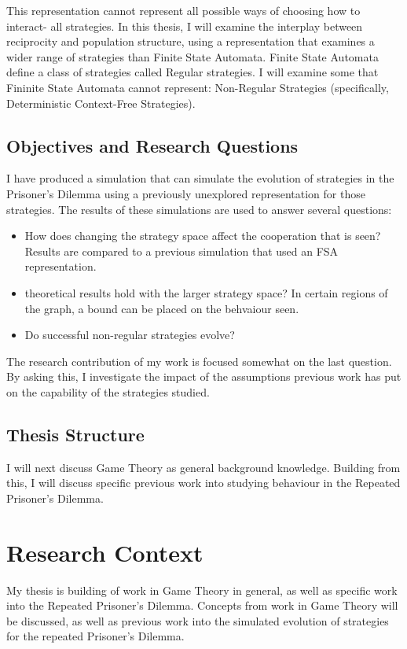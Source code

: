 \documentclass[a4paper,11pt,bcshonoursthesis,singlespace,twoside,thesisdraft,pdflatex]{cssethesis}
\begin{document}
This representation cannot represent all possible ways of choosing how to interact- all strategies. In this thesis, I will examine the interplay between reciprocity and population structure, using a representation that examines a wider range of strategies than Finite State Automata. Finite State Automata define a class of strategies called Regular strategies. I will examine some that Fininite State Automata cannot represent: Non-Regular Strategies (specifically, Deterministic Context-Free Strategies).
\section{Objectives and Research Questions}
I have produced a simulation that can simulate the evolution of strategies in the Prisoner's Dilemma using a previously unexplored representation for those strategies. 
The results of these simulations are used to answer several questions:
\begin{itemize}
\item How does changing the strategy space affect the cooperation that is seen? 
Results are compared to a previous simulation that used an FSA representation. 
\item theoretical results hold with the larger strategy space? In certain regions of the graph, a bound can be placed on the behvaiour seen. 
\item Do successful non-regular strategies evolve?
\end{itemize}
The research contribution of my work is focused somewhat on the last question. 
By asking this, I investigate the impact of the assumptions previous work has put on the capability of the strategies studied. 

\section{Thesis Structure}
I will next discuss Game Theory as general background knowledge. 
Building from this, I will discuss specific previous work into studying behaviour in the Repeated Prisoner's Dilemma. 

\chapter{Research Context}
My thesis is building of work in Game Theory in general, as well as specific work into the Repeated Prisoner's Dilemma. 
Concepts from work in Game Theory will be discussed, as well as previous work into the simulated evolution of strategies for the repeated Prisoner's Dilemma.
\end{document}
